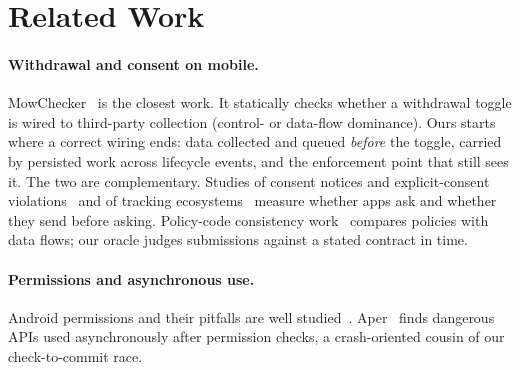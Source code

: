 \section{Related Work}
\label{sec:related}

\paragraph{Withdrawal and consent on mobile.} MowChecker~\cite{du2024mowchecker} is the closest work. It statically
checks whether a withdrawal toggle is wired to third-party collection (control- or data-flow dominance). Ours starts where a correct wiring
ends: data collected and queued \emph{before} the toggle, carried by persisted work across lifecycle events, and the
enforcement point that still sees it. The two are complementary. Studies of consent notices and explicit-consent
violations~\cite{nguyen2021sharefirst,nguyen2022freely,kollnig2021faitaccompli,matte2020cookie} and of tracking
ecosystems~\cite{razaghpanah2018trackers,kollnig2022goodbye} measure whether apps ask and whether they send before asking.
Policy-code consistency work~\cite{slavin2016policy,andow2019policylint,andow2020policheck,zimmeck2019maps} compares
policies with data flows; our oracle judges submissions against a stated contract in time.

\paragraph{Permissions and asynchronous use.} Android permissions and their pitfalls are well
studied~\cite{felt2011demystified,felt2012attention,au2012pscout}. Aper~\cite{wang2022aper} finds dangerous APIs used
asynchronously after permission checks, a crash-oriented cousin of our check-to-commit race.


